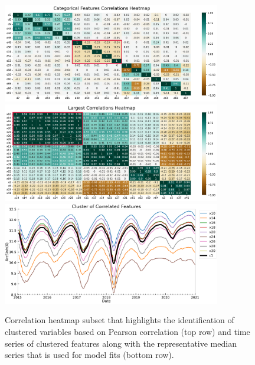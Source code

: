 \documentclass[12pt]{article}
\begin{document}
\begin{figure}[htbp]
\centering
\includegraphics[width=0.85\textwidth]{collinearity} \\[0.5em]
\includegraphics[width=0.85\textwidth]{corr_heatmap} \\[0.5em]
\includegraphics[width=0.85\textwidth]{cluster1} 
\caption{Correlation heatmap subset that highlights the identification of clustered variables based on Pearson correlation (top row) and time series of clustered features along with the representative median series that is used for model fits (bottom row).}
\label{fig:cluster}
\end{figure}
\end{document}
